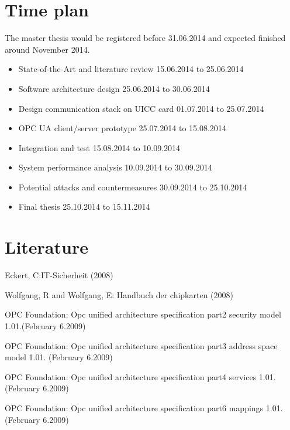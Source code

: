 \documentclass[]{llncs}
\begin{document}
\section{Time plan}
The master thesis would be registered before 31.06.2014 and expected finished around November 2014.
\begin{itemize}
\item State-of-the-Art and literature review		\hfill 15.06.2014 to 25.06.2014
\item Software architecture design \hfill 25.06.2014 to 30.06.2014
\item Design communication stack on UICC card 		 \hfill 01.07.2014 to 25.07.2014
\item OPC UA client/server prototype 		\hfill 25.07.2014 to 15.08.2014
\item Integration and test		\hfill 15.08.2014 to 10.09.2014
\item System performance analysis \hfill 10.09.2014 to 30.09.2014
\item Potential attacks and countermeasures \hfill 30.09.2014 to 25.10.2014
\item Final thesis \hfill 25.10.2014 to 15.11.2014
\end{itemize}

\section{Literature}
Eckert, C:IT-Sicherheit (2008)

Wolfgang, R and Wolfgang, E: Handbuch der chipkarten (2008)

OPC Foundation: Opc unified architecture specification part2 security model 1.01.(February 6.2009)

OPC Foundation: Opc unified architecture specification part3 address space model 1.01. (February 6.2009)

OPC Foundation: Opc unified architecture specification part4 services 1.01.(February 6.2009)

OPC Foundation: Opc unified architecture specification part6 mappings 1.01.(February 6.2009)
\end{document}
